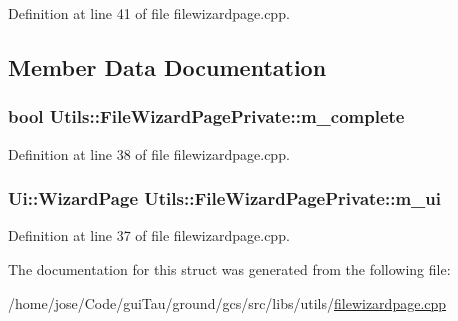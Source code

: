 Definition at line 41 of file filewizardpage.\-cpp.



\subsection{Member Data Documentation}
\hypertarget{struct_utils_1_1_file_wizard_page_private_a5611beabbe4ad84ed8e0fbb836ef2f53}{
\subsubsection[{m\-\_\-complete}]{\setlength{\rightskip}{0pt plus 5cm}bool Utils\-::\-File\-Wizard\-Page\-Private\-::m\-\_\-complete}}\label{struct_utils_1_1_file_wizard_page_private_a5611beabbe4ad84ed8e0fbb836ef2f53}


Definition at line 38 of file filewizardpage.\-cpp.

\hypertarget{struct_utils_1_1_file_wizard_page_private_a19e77ffae3aabb4c49b889cce18563fb}{
\subsubsection[{m\-\_\-ui}]{\setlength{\rightskip}{0pt plus 5cm}Ui\-::\-Wizard\-Page Utils\-::\-File\-Wizard\-Page\-Private\-::m\-\_\-ui}}\label{struct_utils_1_1_file_wizard_page_private_a19e77ffae3aabb4c49b889cce18563fb}


Definition at line 37 of file filewizardpage.\-cpp.



The documentation for this struct was generated from the following file\-:\begin{DoxyCompactItemize}
\item 
/home/jose/\-Code/gui\-Tau/ground/gcs/src/libs/utils/\hyperlink{filewizardpage_8cpp}{filewizardpage.\-cpp}\end{DoxyCompactItemize}
